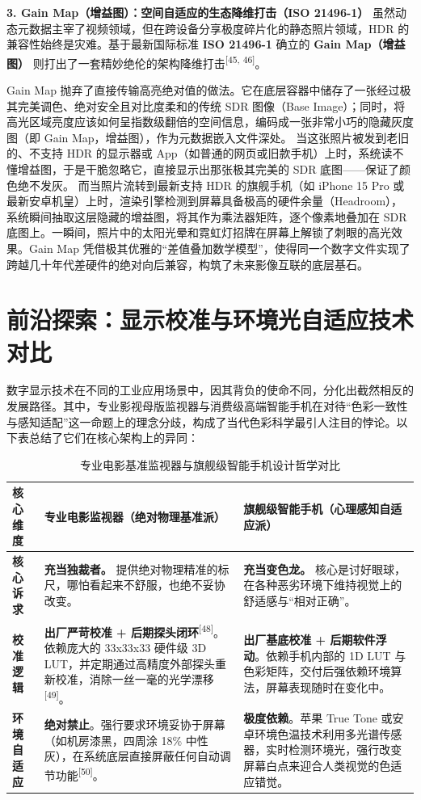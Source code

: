 \documentclass[12pt, a4paper]{ctexart}
\newcommand{\scite}[1]{\textsuperscript{[#1]}}
\begin{document}
\textbf{3. Gain Map（增益图）：空间自适应的生态降维打击（ISO 21496-1）}
虽然动态元数据主宰了视频领域，但在跨设备分享极度碎片化的静态照片领域，HDR 的兼容性始终是灾难。基于最新国际标准 \textbf{ISO 21496-1} 确立的 \textbf{Gain Map（增益图）} 则打出了一套精妙绝伦的架构降维打击\scite{45, 46}。

Gain Map 抛弃了直接传输高亮绝对值的做法。它在底层容器中储存了一张经过极其完美调色、绝对安全且对比度柔和的传统 SDR 图像（Base Image）；同时，将高光区域亮度应该如何呈指数级翻倍的空间信息，编码成一张非常小巧的隐藏灰度图（即 Gain Map，增益图），作为元数据嵌入文件深处。
当这张照片被发到老旧的、不支持 HDR 的显示器或 App（如普通的网页或旧款手机）上时，系统读不懂增益图，于是干脆忽略它，直接显示出那张极其完美的 SDR 底图——保证了颜色绝不发灰。
而当照片流转到最新支持 HDR 的旗舰手机（如 iPhone 15 Pro 或最新安卓机皇）上时，渲染引擎检测到屏幕具备极高的硬件余量（Headroom），系统瞬间抽取这层隐藏的增益图，将其作为乘法器矩阵，逐个像素地叠加在 SDR 底图上。一瞬间，照片中的太阳光晕和霓虹灯招牌在屏幕上解锁了刺眼的高光效果。Gain Map 凭借极其优雅的“差值叠加数学模型”，使得同一个数字文件实现了跨越几十年代差硬件的绝对向后兼容，构筑了未来影像互联的底层基石。

\newpage
\section{前沿探索：显示校准与环境光自适应技术对比}

数字显示技术在不同的工业应用场景中，因其背负的使命不同，分化出截然相反的发展路径。其中，专业影视母版监视器与消费级高端智能手机在对待“色彩一致性与感知适配”这一命题上的理念分歧，构成了当代色彩科学最引人注目的悖论。以下表总结了它们在核心架构上的异同：

\begin{table}[H]
\centering
\caption{专业电影基准监视器与旗舰级智能手机设计哲学对比}
\begin{tabular}{@{} >{\raggedright\arraybackslash}p{2.5cm} >{\raggedright\arraybackslash}p{6.5cm} >{\raggedright\arraybackslash}p{6.5cm} @{}}
\toprule
\textbf{核心维度} & \textbf{专业电影监视器（绝对物理基准派）} & \textbf{旗舰级智能手机（心理感知自适应派）} \\ \midrule
\textbf{核心诉求} & \textbf{充当独裁者。} 提供绝对物理精准的标尺，哪怕看起来不舒服，也绝不妥协改变。 & \textbf{充当变色龙。} 核心是讨好眼球，在各种恶劣环境下维持视觉上的舒适感与“相对正确”。 \\ \addlinespace
\textbf{校准逻辑} & \textbf{出厂严苛校准 + 后期探头闭环}\scite{48}。依赖庞大的 33x33x33 硬件级 3D LUT，并定期通过高精度外部探头重新校准，消除一丝一毫的光学漂移\scite{49}。 & \textbf{出厂基底校准 + 后期软件浮动}。依赖手机内部的 1D LUT 与色彩矩阵，交付后强依赖环境算法，屏幕表现随时在变化中。 \\ \addlinespace
\textbf{环境自适应} & \textbf{绝对禁止}。强行要求环境妥协于屏幕（如机房漆黑，四周涂 18\% 中性灰），在系统底层直接屏蔽任何自动调节功能\scite{50}。 & \textbf{极度依赖}。苹果 True Tone 或安卓环境色温技术利用多光谱传感器，实时检测环境光，强行改变屏幕白点来迎合人类视觉的色适应错觉。 \\ \bottomrule
\end{tabular}
\end{table}
\end{document}
